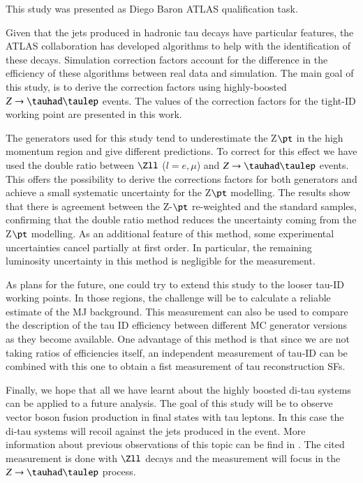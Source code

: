 This study was presented as Diego Baron ATLAS qualification task.

Given that the jets produced in hadronic tau decays have particular features, the ATLAS collaboration has developed algorithms to help with the identification of these decays. Simulation correction factors account for the difference in the efficiency of these algorithms between real data and simulation. The main goal of this study, is to derive the correction factors using highly-boosted $Z\to\tauhad\taulep$ events. The values of the correction factors for the tight-ID working point are presented in this work. 

The generators used for this study tend to underestimate the Z$\pt$ in the high momentum region and give different predictions. To correct for this effect we have used the double ratio between $\Zll$ ($l=e,\mu$) and $Z\to\tauhad\taulep$ events. This offers the possibility to derive the corrections factors for both generators and achieve a small systematic uncertainty for the Z$\pt$ modelling. The results show that there is agreement between the Z-$\pt$ re-weighted and the standard samples, confirming that the double ratio method reduces the uncertainty coming from the Z$\pt$ modelling. As an additional feature of this method, some experimental uncertainties cancel partially at first order. In particular, the remaining luminosity uncertainty in this method is negligible for the measurement.


As plans for the future, one could try to extend this study to the looser tau-ID working points. In those regions, the challenge will be to calculate a reliable estimate of the MJ background. This measurement can also be used to compare the description of the tau ID efficiency between different MC generator versions as they become available. One advantage of this method is that since we are not taking ratios of efficiencies itself, an independent measurement of tau-ID can be combined with this one to obtain a fist measurement of tau reconstruction SFs.

Finally, we hope that all we have learnt about the highly boosted di-tau systems can be applied to a future analysis.  The goal of this study will be to observe vector boson fusion production in final states with tau leptons. In this case the di-tau systems will recoil against the jets produced in the event. More information about previous observations of this topic can be find in \cite{Aad:2014dta,Aaboud:2017emo}. The cited measurement is done with $\Zll$ decays and the measurement will focus in the $Z\to\tauhad\taulep$ process.